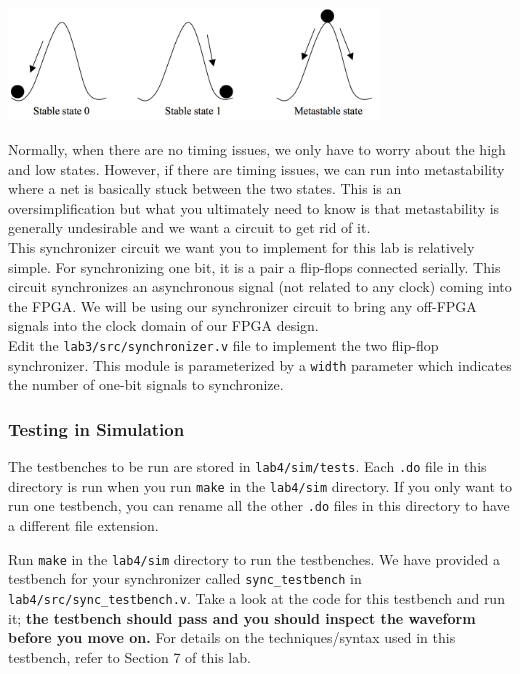 \documentclass[11pt]{article}
\begin{document}
\begin{center}
\includegraphics[height=3cm]{images/lab2_fig3.png}
\end{center}

Normally, when there are no timing issues, we only have to worry about the high and low states. However, if there are timing issues, we can run into metastability where a net is basically stuck between the two states. This is an oversimplification but what you ultimately need to know is that metastability is generally undesirable and we want a circuit to get rid of it. \\

This synchronizer circuit we want you to implement for this lab is relatively simple. For synchronizing one bit, it is a pair a flip-flops connected serially. This circuit synchronizes an asynchronous signal (not related to any clock) coming into the FPGA. We will be using our synchronizer circuit to bring any off-FPGA signals into the clock domain of our FPGA design.\\

Edit the \verb|lab3/src/synchronizer.v| file to implement the two flip-flop synchronizer. This module is parameterized by a \verb|width| parameter which indicates the number of one-bit signals to synchronize.

\subsubsection{Testing in Simulation}
The testbenches to be run are stored in \verb|lab4/sim/tests|. Each \verb|.do| file in this directory is run when you run \verb|make| in the \verb|lab4/sim| directory. If you only want to run one testbench, you can rename all the other \verb|.do| files in this directory to have a different file extension.

Run \verb|make| in the \verb|lab4/sim| directory to run the testbenches. We have provided a testbench for your synchronizer called \verb|sync_testbench| in \verb|lab4/src/sync_testbench.v|. Take a look at the code for this testbench and run it; \textbf{the testbench should pass and you should inspect the waveform before you move on.} For details on the techniques/syntax used in this testbench, refer to Section 7 of this lab.
\end{document}

